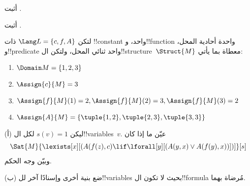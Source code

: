 \documentclass[../../../include/open-logic-section]{subfiles}
\begin{document}

\begin{prob}
  أثبت .
\end{prob}
\tagendprob


\begin{prob}
  أثبت .
\end{prob}
\tagendprob

\begin{prob}
لتكن $\Lang L = \{c, f, A\}$ ذات !!{constant} واحد، و!!{function}
واحدة أحادية المحل، و!!{predicate} واحد ثنائي المحل، ولتكن
ال!!{structure}~$\Struct{M}$ معطاة بما يأتي:
\begin{enumerate}
\item $\Domain M = \{1, 2, 3\}$
\item $\Assign{c}{M} = 3$
\item $\Assign{f}{M}(1) = 2, \Assign{f}{M}(2) = 3, \Assign{f}{M}(3) = 2$
\item $\Assign{A}{M} = \{\tuple{1, 2}, \tuple{2, 3}, \tuple{3, 3}\}$
\end{enumerate}
(أ) ليكن $s(v) = 1$ لكل ال!!{variable}s~$v$. عيّن ما إذا كان
\[
\Sat{M}{\lexists[x][(A(f(z), c) \lif \lforall[y][(A(y, x) \lor A(f(y),
      x))])]}[s]
\]
وبيّن وجه الحكم.

(ب) ضع بنية أخرى وإسنادًا آخر لل!!{variable}s بحيث لا تكون
ال!!{formula} مُرضاة بهما.
\end{prob}
\end{document}
